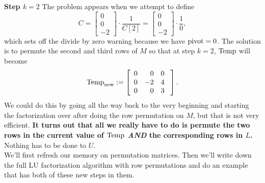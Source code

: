  \textbf{Step $k=2$} The problem appears when we attempt to define 
$$C=   \left[\begin{array}{r} 0\\ 0 \\ -2 \end{array} \right] \cdot \frac{1}{C[2]} = \left[\begin{array}{r} 0\\ 0 \\ -2 \end{array} \right] \cdot \frac{1}{0},$$
which sets off the divide by zero warning because we have ${\rm pivot}=0$. The solution is to permute the second and third rows of $M$ so that at step $k=2$, ${\rm Temp}$ will become
$${\rm Temp}_{\rm new}:=\left[ \begin{array}{rrr} 0 & 0 & 0\\
0 &-2 & 4 \\ 
 0 & 0& 3 \end{array}\ \right]. $$
 We could do this by going all the way back to the very beginning and starting the factorization over after doing the row permutation on $M$, but that is not very efficient. \textbf{It turns out that all we really have to do is permute the two rows in the current value of ${\rm Temp}$ \textit{AND} the corresponding rows in $L$.} Nothing has to be done to $U$. \\
 
 We'll first refresh our memory on permutation matrices. Then we'll write down the full LU factorization algorithm with row permutations and do an example that has both of these new steps in them. \\
 
